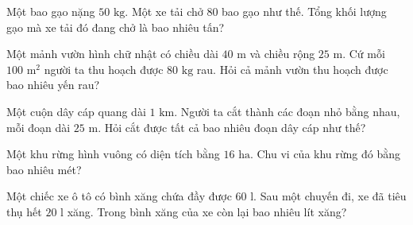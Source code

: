 \begin{ex} %
Một bao gạo nặng $50\text{ kg}$. Một xe tải chở $80$ bao gạo như thế. Tổng khối lượng gạo mà xe tải đó đang chở là bao nhiêu tấn?
\end{ex}

\begin{ex} %
Một mảnh vườn hình chữ nhật có chiều dài $40\text{ m}$ và chiều rộng $25\text{ m}$. Cứ mỗi $100\text{ m}^2$ người ta thu hoạch được $80\text{ kg}$ rau. Hỏi cả mảnh vườn thu hoạch được bao nhiêu yến rau?
\end{ex}

\begin{ex} %
Một cuộn dây cáp quang dài $1\text{ km}$. Người ta cắt thành các đoạn nhỏ bằng nhau, mỗi đoạn dài $25\text{ m}$. Hỏi cắt được tất cả bao nhiêu đoạn dây cáp như thế?
\end{ex}

\begin{ex} %
Một khu rừng hình vuông có diện tích bằng $16\text{ ha}$. Chu vi của khu rừng đó bằng bao nhiêu mét?
\end{ex}

\begin{ex} %
Một chiếc xe ô tô có bình xăng chứa đầy được $60\text{ l}$. Sau một chuyến đi, xe đã tiêu thụ hết $20\text{ l}$ xăng. Trong bình xăng của xe còn lại bao nhiêu lít xăng?
\end{ex}
